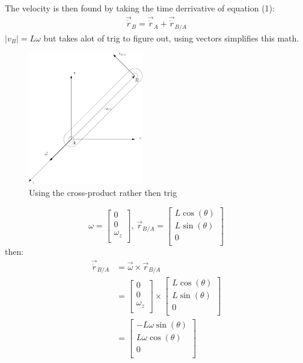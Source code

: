 \documentclass[11pt, a4paper]{article}
\begin{document}
The velocity is then found by taking the time derrivative of equation (1):
\begin{gather}
  \vec{\dot{r}}_B = \vec{\dot{r}}_A + \vec{\dot{r}}_{B/A}
\end{gather}
$|v_B|=L\omega$ but takes alot of trig to figure out, using vectors simplifies this math.
\begin{figure}[h]
  \centerline{\includegraphics[width=50mm]{images/Omega_vector.png}}
  \caption{Using the cross-product rather then trig}
\end{figure}
\begin{equation}
  \omega = \begin{bmatrix} 0\\ 0\\ \omega_z\\ \end{bmatrix},\, \vec{r}_{B/A} = \begin{bmatrix} L\cos(\theta)\\ L\sin(\theta)\\ 0\\ \end{bmatrix}
\end{equation}
then:
\begin{align}
  \vec{\dot{r}}_{B/A} &= \vec{\omega} \times \vec{r}_{B/A}\\
                      &=  \begin{bmatrix} 0\\ 0\\ \omega_z\\ \end{bmatrix} \times \begin{bmatrix} L\cos  (\theta)\\ L\sin(\theta)\\ 0\\ \end{bmatrix}\\
                      &=  \begin{bmatrix} -L\omega \sin(\theta)\\ L\omega \cos(\theta)\\ 0\\ \end{bmatrix} 
\end{align}
\end{document}
